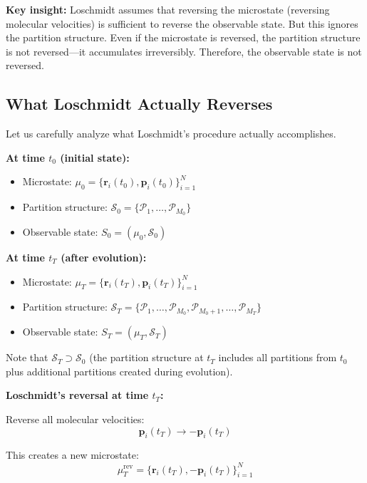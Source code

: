 \documentclass[twocolumn,10pt]{article}
\theoremstyle{definition}
\theoremstyle{remark}
\begin{document}
\noindent\textbf{Key insight:} Loschmidt assumes that reversing the microstate (reversing molecular velocities) is sufficient to reverse the observable state. But this ignores the partition structure. Even if the microstate is reversed, the partition structure is not reversed—it accumulates irreversibly. Therefore, the observable state is not reversed.

\subsection{What Loschmidt Actually Reverses}

Let us carefully analyze what Loschmidt's procedure actually accomplishes.

\vspace{0.2cm}
\noindent\textbf{At time $t_0$ (initial state):}
\begin{itemize}
\item Microstate: $\mu_0 = \{\mathbf{r}_i(t_0), \mathbf{p}_i(t_0)\}_{i=1}^N$
\item Partition structure: $\mathcal{S}_0 = \{\mathcal{P}_1, \ldots, \mathcal{P}_{M_0}\}$
\item Observable state: $S_0 = (\mu_0, \mathcal{S}_0)$
\end{itemize}

\noindent\textbf{At time $t_T$ (after evolution):}
\begin{itemize}
\item Microstate: $\mu_T = \{\mathbf{r}_i(t_T), \mathbf{p}_i(t_T)\}_{i=1}^N$
\item Partition structure: $\mathcal{S}_T = \{\mathcal{P}_1, \ldots, \mathcal{P}_{M_0}, \mathcal{P}_{M_0+1}, \ldots, \mathcal{P}_{M_T}\}$
\item Observable state: $S_T = (\mu_T, \mathcal{S}_T)$
\end{itemize}

Note that $\mathcal{S}_T \supset \mathcal{S}_0$ (the partition structure at $t_T$ includes all partitions from $t_0$ plus additional partitions created during evolution).

\vspace{0.2cm}
\noindent\textbf{Loschmidt's reversal at time $t_T$:}

Reverse all molecular velocities:
\begin{equation}
\mathbf{p}_i(t_T) \to -\mathbf{p}_i(t_T)
\end{equation}

This creates a new microstate:
\begin{equation}
\mu_T^{\text{rev}} = \{\mathbf{r}_i(t_T), -\mathbf{p}_i(t_T)\}_{i=1}^N
\end{equation}
\end{document}
